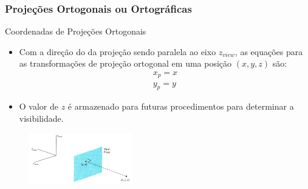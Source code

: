 \documentclass{beamer}
\begin{document}
\begin{frame}
\frametitle{Projeções Ortogonais ou Ortográficas}
	\begin{block}{Coordenadas de Projeções Ortogonais}
		\begin{itemize}
			\item Com a direção do da projeção sendo paralela ao eixo $z_{view}$, as equações para as transformações de projeção ortogonal em uma posição $(x,y,z)$ são:
			\begin{eqnarray*}
				x_p = x \\
				y_p = y
			\end{eqnarray*}
			\item O valor de $z$ é armazenado para futuras procedimentos para determinar a visibilidade.
		\end{itemize}
	\end{block}
	\begin{figure}[!h]
			\begin{center}
			\includegraphics[width=0.4\textwidth]{Figures/PlaProOrt}
			\end{center}
	\end{figure}
\end{frame}
\end{document}
